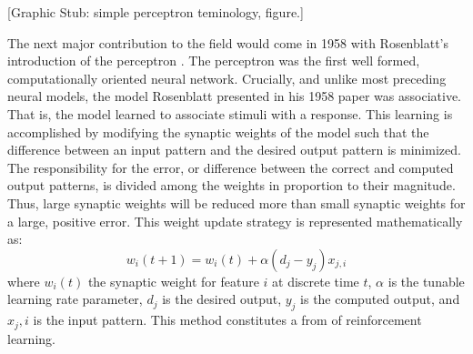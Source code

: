 \documentclass[11pt]{afthesis}
\begin{document}
	
	[Graphic Stub: simple perceptron teminology, figure.]
	
	The next major contribution to the field would come in 1958 with Rosenblatt's introduction of the perceptron \cite{rosenblatt1958perceptron}. The perceptron was the first \cite{anderson1988neurocomputing} well formed, computationally oriented neural network. Crucially, and unlike most preceding neural models, the model Rosenblatt presented in his  1958 paper was associative. That is, the model learned to associate stimuli with a response. This learning is accomplished by modifying the synaptic weights of the model such that the difference between an input pattern and the desired output pattern is minimized. The responsibility for the error, or difference between the correct and computed output patterns, is divided among the weights in proportion to their magnitude. Thus, large synaptic weights will be reduced more than small synaptic weights for a large, positive error. This weight update strategy is represented mathematically as: \begin{equation} 
	w_i(t+1) = w_i(t) + \alpha(d_j - y_j)x_{j,i}
	\end{equation} where \begin{math} w_i(t) \end{math} the synaptic weight for feature \begin{math} i \end{math} at discrete time \begin{math} t \end{math}, \begin{math} \alpha \end{math} is the tunable learning rate parameter, \begin{math} d_j \end{math} is the desired output, \begin{math} y_j \end{math} is the computed output, and \begin{math} x_j,i \end{math} is the input pattern. This method constitutes a from of reinforcement learning.
	
\end{document}
